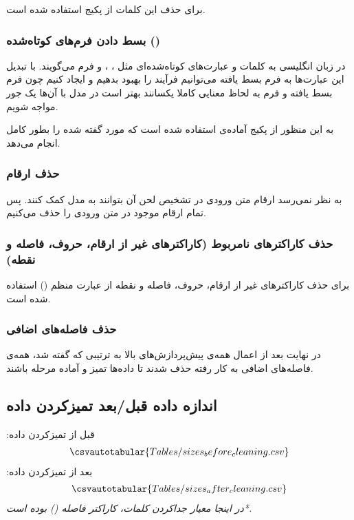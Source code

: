 {{{برای حذف این کلمات از پکیج  استفاده شده است.
}
\subsubsection{\Large بسط دادن فرم‌های کوتاه‌شده ()}
{
در زبان انگلیسی به کلمات و عبارت‌های کوتاه‌شده‌ای مثل 
،
،
و
 فرم
می‌گویند. با تبدیل این عبارت‌ها به فرم بسط‌ یافته می‌توانیم فرآیند 
 را بهبود بدهیم و  ایجاد کنیم چون فرم بسط‌ یافته و فرم  به لحاظ معنایی کاملا یکسانند بهتر است در مدل با آن‌ها یک جور مواجه شویم.

به این منظور از پکیج آماده‌ی  استفاده شده است که مورد گفته شده را بطور کامل انجام می‌دهد.
}
\subsubsection{\Large حذف ارقام}
{
به نظر نمی‌رسد ارقام متن ورودی در تشخیص لحن آن بتوانند به مدل کمک کنند. پس تمام ارقام موجود در متن ورودی را حذف می‌کنیم.
}
\subsubsection{\Large حذف کاراکترهای نامربوط (کاراکترهای غیر از ارقام، حروف، فاصله و نقطه)}
{
برای حذف کاراکترهای غیر از ارقام، حروف، فاصله و نقطه از عبارت منظم () استفاده شده است.
}
\subsubsection{\Large حذف فاصله‌های اضافی}
{
در نهایت بعد از اعمال همه‌ی پیش‌پردازش‌های بالا به ترتیبی که گفته شد، همه‌ی فاصله‌های اضافی به کار رفته حذف شدند تا داده‌ها تمیز و آماده مرحله  باشند.
}
}
\newpage
\subsection{اندازه داده قبل/بعد تمیزکردن داده}
{
قبل از تمیزکردن داده:
\begin{align*}
  \csvautotabular{Tables/sizes_before_cleaning.csv}  
\end{align*}
بعد از تمیزکردن داده:
\begin{align*}
  \csvautotabular{Tables/sizes_after_cleaning.csv}  
\end{align*}
\emph{*در اینجا معیار جداکردن کلمات، کاراکتر فاصله () بوده است.}
}
}